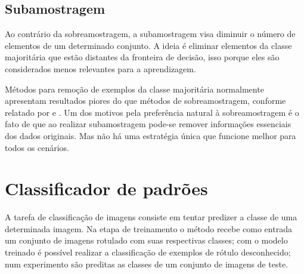 \subsection{Subamostragem}

Ao contrário da sobreamostragem, a subamostragem visa diminuir o número de elementos de um determinado conjunto. A ideia é eliminar elementos da classe majoritária que estão distantes da fronteira de decisão, isso porque eles são considerados menos relevantes para a aprendizagem.

Métodos para remoção de exemplos da classe majoritária normalmente apresentam resultados piores do que métodos de sobreamostragem, conforme relatado por  e . Um dos motivos pela preferência natural à sobreamostragem é o fato de que ao realizar subamostragem pode-se remover informações essenciais dos dados originais. Mas não há uma estratégia única que funcione melhor para todos os cenários.

\section{Classificador de padrões}
\label{sec:classificadores}

A tarefa de classificação de imagens consiste em tentar predizer a classe de uma determinada imagem. Na etapa de treinamento o método recebe como entrada um conjunto de imagens rotulado com suas respectivas classes; com o modelo treinado é possível realizar a classificação de exemplos de rótulo desconhecido; num experimento são preditas as classes de um conjunto de imagens de teste.





